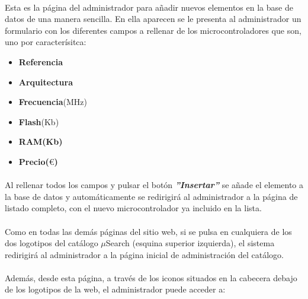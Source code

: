 \paragraph{} Esta es la página del administrador para añadir nuevos elementos en la base de datos de una manera sencilla. En ella aparecen se le presenta al administrador un formulario con los diferentes campos a rellenar de los microcontroladores que son, uno por caracterísitca:
\begin{itemize}
\item \textbf{Referencia}
\item \textbf{Arquitectura}
\item \textbf{Frecuencia}(MHz) 
\item \textbf{Flash}(Kb)
\item \textbf{RAM(Kb)} 
\item \textbf{Precio($\euro$)}
\end{itemize}

\paragraph{} Al rellenar todos los campos y pulsar el botón \textbf{\textit{''Insertar''}} se añade el elemento a la base de datos y automáticamente se redirigirá al administrador a la página de listado completo, con el nuevo microcontrolador ya incluido en la lista.

\paragraph{}Como en todas las demás páginas del sitio web, si se pulsa en cualquiera de los dos logotipos del catálogo $\mu$Search (esquina superior izquierda), el sistema redirigirá al administrador a la página inicial de administración del catálogo.

\paragraph{}Además, desde esta página, a través de los iconos situados en la cabecera debajo de los logotipos de la web, el administrador puede acceder a:

